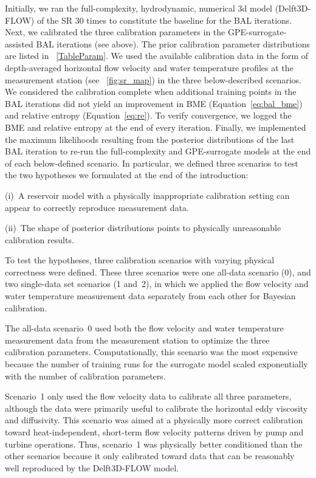 \documentclass[draft,linenumbers,onecolumn]{agujournal2019} %
\begin{document}
Initially, we ran the full-complexity, hydrodynamic, numerical 3d model (Delft3D-FLOW) of the SR 30 times to constitute the baseline for the BAL iterations. Next, we calibrated the three calibration parameters in the GPE-surrogate-assisted BAL iterations (see above). The prior calibration parameter distributions are listed in \tablename{~\ref{TableParam}}.
We used the available calibration data in the form of depth-averaged horizontal flow velocity and water temperature profiles at the measurement station (see \figurename{~\ref{fig:sr_map}}) in the three below-described scenarios. We considered the calibration complete when additional training points in the BAL iterations did not yield an improvement in BME (Equation~\ref{eq:bal_bme}) and relative entropy (Equation~\ref{eq:re}). To verify convergence, we logged the BME and relative entropy at the end of every iteration. Finally, we implemented the maximum likelihoods resulting from the posterior distributions of the last BAL iteration to re-run the full-complexity and GPE-surrogate models at the end of each below-defined scenario. In particular, we defined three scenarios to test the two hypotheses we formulated at the end of the introduction: 

(i)~A reservoir model with a physically inappropriate calibration setting can appear to correctly reproduce measurement data.

(ii)~The shape of posterior distributions points to physically unreasonable calibration results.

To test the hypotheses, three calibration scenarios with varying physical correctness were defined. These three scenarios were one all-data scenario (0), and two single-data set scenarios (1 and~2), in which we applied the flow velocity and water temperature measurement data separately from each other for Bayesian calibration.

The all-data scenario~0 used both the flow velocity and water temperature measurement data from the measurement station to optimize the three calibration parameters. Computationally, this scenario was the most expensive because the number of training runs for the surrogate model scaled exponentially with the number of calibration parameters.

Scenario~1 only used the flow velocity data to calibrate all three parameters, although the data were primarily useful to calibrate the horizontal eddy viscosity and diffusivity. This scenario was aimed at a physically more correct calibration toward heat-independent, short-term flow velocity patterns driven by pump and turbine operations. Thus, scenario~1 was physically better conditioned than the other scenarios because it only calibrated toward data that can be reasonably well reproduced by the Delft3D-FLOW model.
\end{document}
